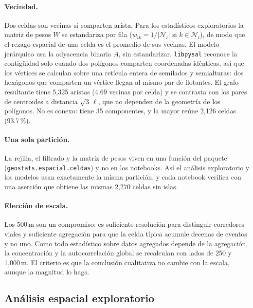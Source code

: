 \paragraph{Vecindad.} Dos celdas son vecinas si comparten arista. Para los
estadísticos exploratorios la matriz de pesos $W$ se estandariza por fila
($w_{ik} = 1/|\mathcal{N}_i|$ si $k \in \mathcal{N}_i$), de modo que el
rezago espacial de una celda es el promedio de sus vecinas. El modelo
jerárquico usa la adyacencia binaria $A$, sin estandarizar.
\texttt{libpysal} reconoce la contigüidad solo cuando dos polígonos comparten
coordenadas idénticas, así que los vértices se calculan sobre una retícula
entera de semilados y semialturas: dos hexágonos que comparten un vértice
llegan al mismo par de flotantes. El grafo resultante tiene 5,325 aristas
(4.69 vecinas por celda) y se contrasta con los pares de centroides a
distancia $\sqrt{3}\,\ell$, que no dependen de la geometría de los
polígonos. No es conexo: tiene 35 componentes, y la mayor reúne 2,126 celdas
(93.7\,\%).

\paragraph{Una sola partición.} La rejilla, el filtrado y la matriz de pesos
viven en una función del paquete (\texttt{geostats.espacial.celdas}) y no en
los notebooks. Así el análisis exploratorio y los modelos usan exactamente la
misma partición, y cada notebook verifica con una aserción que obtiene las
mismas 2,270 celdas sin islas.

\paragraph{Elección de escala.} Los 500\,m son un compromiso: es suficiente
resolución para distinguir corredores viales y suficiente agregación para
que la celda típica acumule decenas de eventos y no uno. Como todo
estadístico sobre datos agregados depende de la agregación, la concentración
y la autocorrelación global se recalculan con lados de 250 y 1,000\,m. El
criterio es que la conclusión cualitativa no cambie con la escala, aunque
la magnitud lo haga.

\subsection{Análisis espacial exploratorio}\label{sec:met-exploratorio}

